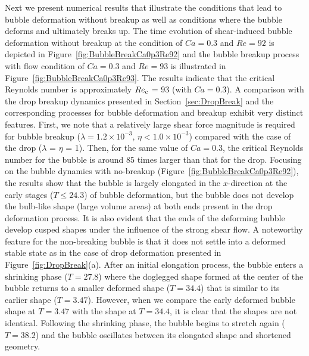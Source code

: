 \documentclass[review]{elsarticle}
\begin{document}
%
Next we present numerical results that illustrate the conditions that lead to
bubble deformation without breakup as well as conditions where the bubble
deforms and ultimately breaks up.  The time evolution of shear-induced bubble
deformation without breakup at the condition of $Ca=0.3$ and $Re=92$ is
depicted in Figure~\ref{fig:BubbleBreakCa0p3Re92} and the bubble breakup
process with flow condition of $Ca=0.3$ and $Re=93$ is illustrated in
Figure~\ref{fig:BubbleBreakCa0p3Re93}.  The results indicate that the critical
Reynolds number is approximately $Re_{\rm c}$ = 93 (with $Ca=0.3$).  A comparison
with the drop breakup dynamics presented in Section~\ref{sec:DropBreak} and the
corresponding processes for bubble deformation and breakup exhibit very
distinct features.  First, we note that a relatively large shear force
magnitude is required for bubble breakup 
($\lambda = 1.2 \times 10^{-3}$, $\eta < 1.0 \times 10^{-3}$) 
compared with the case of the drop ($\lambda$ = $\eta$ = 1). Then,
for the same value of $Ca=0.3$, the critical Reynolds number for the bubble is
around 85 times larger than that for the drop.  Focusing on the bubble dynamics
with no-breakup (Figure~\ref{fig:BubbleBreakCa0p3Re92}), the results show that
the bubble is largely elongated in the $x$-direction at the early stages ($T
\leq 24.3$) of bubble deformation, but the bubble does not develop the
bulb-like shape (large volume areas) at both ends present in the drop
deformation process.  It is also evident that the ends of the deforming bubble
develop cusped shapes under the influence of the strong shear flow.  A
noteworthy feature for the non-breaking bubble is that it does not settle into
a deformed stable state as in the case of drop deformation presented in
Figure~\ref{fig:DropBreak}(a).  After an initial elongation process, the bubble
enters a shrinking phase ($T = 27.8$) where the doglegged shape formed at the
center of the bubble returns to a smaller deformed shape ($T = 34.4$) that is
similar to its earlier shape ($T=3.47$).  However, when we compare the early
deformed bubble shape at $T = 3.47$ with the shape at $T = 34.4$, it is clear
that the shapes are not identical.  Following the shrinking phase, the bubble
begins to stretch again ($T = 38.2$) and the bubble oscillates between its
elongated shape and shortened geometry.  
\end{document}

